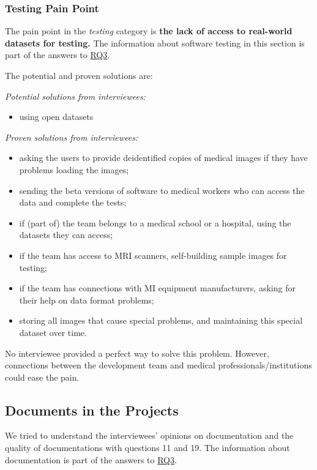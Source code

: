 \documentclass[final, 3p, times, authoryear]{elsarticle}
\begin{document}
\subsubsection{Testing Pain Point} \label{sec_pain_points_3}

The pain point in the \textit{testing} category is \textbf{the lack of access to
real-world datasets for testing.} The information about software testing in this
section is part of the answers to \hyperlink{rq3}{RQ3}.

The potential and proven solutions are:

\noindent\textit{Potential solutions from interviewees:}

\begin{itemize}
\item using open datasets
\end{itemize}

\noindent\textit{Proven solutions from interviewees:}

\begin{itemize}
\item asking the users to provide deidentified copies of medical images if they
have problems loading the images;
\item sending the beta versions of software to medical workers who can access
the data and complete the tests;
\item if (part of) the team belongs to a medical school or a hospital, using the
datasets they can access;
\item if the team has access to MRI scanners, self-building sample images for
testing;
\item if the team has connections with MI equipment manufacturers, asking for
their help on data format problems;
\item storing all images that cause special problems, and maintaining this
special dataset over time.
\end{itemize}

No interviewee provided a perfect way to solve this problem. However,
connections between the development team and medical professionals/institutions
could ease the pain.

\subsection{Documents in the Projects} \label{sec_interview_documents}

We tried to understand the interviewees' opinions on documentation and the
quality of documentations with questions 11 and 19. The information about
documentation is part of the answers to \hyperlink{rq3}{RQ3}.
\end{document}
